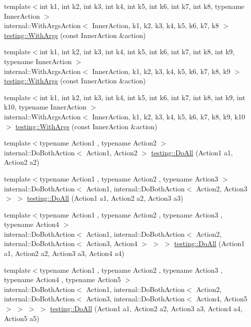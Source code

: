 \begin{DoxyCompactItemize}
\item 
{\footnotesize template$<$int k1, int k2, int k3, int k4, int k5, int k6, int k7, int k8, typename Inner\+Action $>$ }\\internal\+::\+With\+Args\+Action$<$ Inner\+Action, k1, k2, k3, k4, k5, k6, k7, k8 $>$ \hyperlink{namespacetesting_a16c131c0d58ae07d2e1ee6c7a44aaad1}{testing\+::\+With\+Args} (const Inner\+Action \&action)
\item 
{\footnotesize template$<$int k1, int k2, int k3, int k4, int k5, int k6, int k7, int k8, int k9, typename Inner\+Action $>$ }\\internal\+::\+With\+Args\+Action$<$ Inner\+Action, k1, k2, k3, k4, k5, k6, k7, k8, k9 $>$ \hyperlink{namespacetesting_a6aec78e6c201b150c78271e3f851414e}{testing\+::\+With\+Args} (const Inner\+Action \&action)
\item 
{\footnotesize template$<$int k1, int k2, int k3, int k4, int k5, int k6, int k7, int k8, int k9, int k10, typename Inner\+Action $>$ }\\internal\+::\+With\+Args\+Action$<$ Inner\+Action, k1, k2, k3, k4, k5, k6, k7, k8, k9, k10 $>$ \hyperlink{namespacetesting_a768a620ad07c6b5822201fa4f15fb4f0}{testing\+::\+With\+Args} (const Inner\+Action \&action)
\item 
{\footnotesize template$<$typename Action1 , typename Action2 $>$ }\\internal\+::\+Do\+Both\+Action$<$ Action1, Action2 $>$ \hyperlink{namespacetesting_a5f533932753d2af95000e96c4a3042e3}{testing\+::\+Do\+All} (Action1 a1, Action2 a2)
\item 
{\footnotesize template$<$typename Action1 , typename Action2 , typename Action3 $>$ }\\internal\+::\+Do\+Both\+Action$<$ Action1, internal\+::\+Do\+Both\+Action$<$ Action2, Action3 $>$ $>$ \hyperlink{namespacetesting_ad6a3ce5e229120ea287286a86394d712}{testing\+::\+Do\+All} (Action1 a1, Action2 a2, Action3 a3)
\item 
{\footnotesize template$<$typename Action1 , typename Action2 , typename Action3 , typename Action4 $>$ }\\internal\+::\+Do\+Both\+Action$<$ Action1, internal\+::\+Do\+Both\+Action$<$ Action2, internal\+::\+Do\+Both\+Action$<$ Action3, Action4 $>$ $>$ $>$ \hyperlink{namespacetesting_a790ce08c80a1f8ececa0f2a4f678247c}{testing\+::\+Do\+All} (Action1 a1, Action2 a2, Action3 a3, Action4 a4)
\item 
{\footnotesize template$<$typename Action1 , typename Action2 , typename Action3 , typename Action4 , typename Action5 $>$ }\\internal\+::\+Do\+Both\+Action$<$ Action1, internal\+::\+Do\+Both\+Action$<$ Action2, internal\+::\+Do\+Both\+Action$<$ Action3, internal\+::\+Do\+Both\+Action$<$ Action4, Action5 $>$ $>$ $>$ $>$ \hyperlink{namespacetesting_a794c41d43373d7af9cebbc7f1c5e4a57}{testing\+::\+Do\+All} (Action1 a1, Action2 a2, Action3 a3, Action4 a4, Action5 a5)

\end{DoxyCompactItemize}
